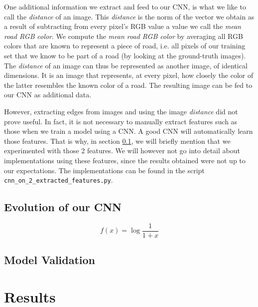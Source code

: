 \documentclass[10pt,conference,compsocconf]{IEEEtran}
\begin{document}
One additional information we extract and feed to our CNN, is what we like to call the \textit{distance} of an image. This  \textit{distance} is the norm of the vector we obtain as a result of subtracting from every pixel's RGB value a value we call the \textit{mean road RGB color}. We compute the \textit{mean road RGB color} by averaging all RGB colors that are known to represent a piece of road, i.e. all pixels of our training set that we know to be part of a road (by looking at the ground-truth images). The \textit{distance} of an image can thus be represented as another image, of identical dimensions. It is an image that represents, at every pixel, how closely the color of the latter resembles the known color of a road. The resulting image can be fed to our CNN as additional data.

However, extracting edges from images and using the image \textit{distance} did not prove useful. In fact, it is not necessary to manually extract features such as those when we train a model using a CNN. A good CNN will automatically learn those features. That is why, in section \ref{ssec:technique}, we will briefly mention that we experimented with those 2 features. We will however not go into detail about implementations using these features, since the results obtained were not up to our expectations. The implementations can be found in the script \texttt{cnn\_on\_2\_extracted\_features.py}.


\subsection{Evolution of our CNN} 
\label{ssec:technique}

\begin{equation} 
	\label{eq1}
	f(x) = \log{\frac{1}{1+x}}
\end{equation}


\subsection{Model Validation} 
\label{ssec:model_validation}


\section{Results}
\label{sec:results}
\end{document}

